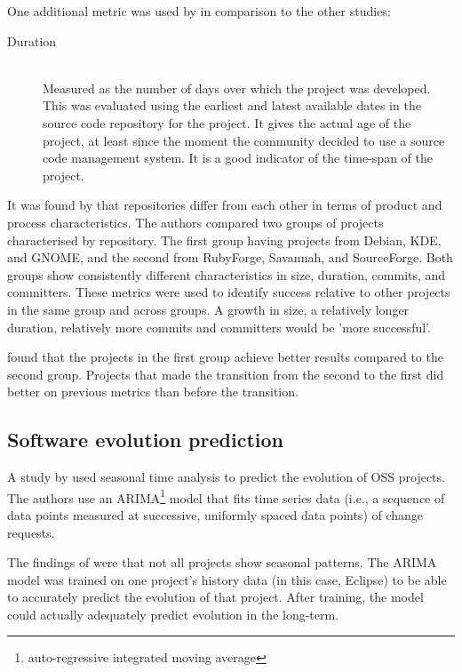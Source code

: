 One additional metric was used by \citeauthor{beecher} in comparison to the
other studies:
\begin{description}
	\item[Duration] \hfill \\ Measured as the number of days over which the
		project was developed. This was evaluated using the earliest and latest
		available dates in the source code repository for the project. It gives the
		actual age of the project, at least since the moment the community decided to
		use a source code management system. It is a good indicator of the time-span
		of the project.
\end{description}

\noindent
It was found by \citeauthor{beecher} that repositories differ from each other in
terms of product and process characteristics. The authors compared two groups of
projects characterised by repository. The first group having projects from
Debian, KDE, and GNOME, and the second from RubyForge, Savannah, and
SourceForge. Both groups show consistently different characteristics in size,
duration, commits, and committers. These metrics were used to identify success
relative to other projects in the same group and across groups. A growth in
size, a relatively longer duration, relatively more commits and committers
would be 'more successful'.

\citeauthor{beecher} found that the projects in the first group achieve better
results compared to the second group. Projects that made the transition from
the second to the first did better on previous metrics than before the
transition.

\subsection{Software evolution prediction}
A study by \citet{goulao} used seasonal time analysis to predict the evolution
of OSS projects. The authors use an ARIMA\footnote{auto-regressive integrated
moving average} model that fits time series data (i.e., a sequence of data
points measured at successive, uniformly spaced data points) of change
requests.

The findings of \citeauthor{goulao} were that not all projects show seasonal
patterns. The ARIMA model was trained on one project's history data (in this
case, Eclipse) to be able to accurately predict the evolution of that project.
After training, the model could actually adequately predict evolution in the
long-term.

